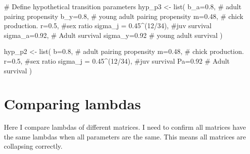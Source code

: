 \documentclass[
  letterpaper,
  DIV=11,
  numbers=noendperiod]{scrartcl}
\newenvironment{Shaded}{\begin{snugshade}}{\end{snugshade}}
\newcommand{\AttributeTok}[1]{\textcolor[rgb]{0.40,0.45,0.13}{#1}}
\newcommand{\CommentTok}[1]{\textcolor[rgb]{0.37,0.37,0.37}{#1}}
\newcommand{\DecValTok}[1]{\textcolor[rgb]{0.68,0.00,0.00}{#1}}
\newcommand{\FloatTok}[1]{\textcolor[rgb]{0.68,0.00,0.00}{#1}}
\newcommand{\FunctionTok}[1]{\textcolor[rgb]{0.28,0.35,0.67}{#1}}
\newcommand{\NormalTok}[1]{\textcolor[rgb]{0.00,0.23,0.31}{#1}}
\newcommand{\OtherTok}[1]{\textcolor[rgb]{0.00,0.23,0.31}{#1}}
\newcommand{\SpecialCharTok}[1]{\textcolor[rgb]{0.37,0.37,0.37}{#1}}
\begin{document}
\begin{Shaded}
\begin{Highlighting}[]
\CommentTok{\# Define hypothetical transition parameters}
\NormalTok{hyp\_p3 }\OtherTok{\textless{}{-}} \FunctionTok{list}\NormalTok{(}
  \AttributeTok{b\_a=}\FloatTok{0.8}\NormalTok{,   }\CommentTok{\# adult pairing propensity}
  \AttributeTok{b\_y=}\FloatTok{0.8}\NormalTok{, }\CommentTok{\# young adult pairing propensity}
  \AttributeTok{m=}\FloatTok{0.48}\NormalTok{, }\CommentTok{\# chick production.    }
  \AttributeTok{r=}\FloatTok{0.5}\NormalTok{,   }\CommentTok{\#sex ratio   }
  \AttributeTok{sigma\_j =} \FloatTok{0.45}\SpecialCharTok{\^{}}\NormalTok{(}\DecValTok{12}\SpecialCharTok{/}\DecValTok{34}\NormalTok{), }\CommentTok{\#juv survival}
  \AttributeTok{sigma\_a=}\FloatTok{0.92}\NormalTok{,  }\CommentTok{\# Adult survival}
  \AttributeTok{sigma\_y=}\FloatTok{0.92} \CommentTok{\# young adult survival}
\NormalTok{)}

\NormalTok{hyp\_p2 }\OtherTok{\textless{}{-}} \FunctionTok{list}\NormalTok{(}
  \AttributeTok{b=}\FloatTok{0.8}\NormalTok{,   }\CommentTok{\# adult pairing propensity}
  \AttributeTok{m=}\FloatTok{0.48}\NormalTok{, }\CommentTok{\# chick production.    }
  \AttributeTok{r=}\FloatTok{0.5}\NormalTok{,   }\CommentTok{\#sex ratio   }
  \AttributeTok{sigma\_j =} \FloatTok{0.45}\SpecialCharTok{\^{}}\NormalTok{(}\DecValTok{12}\SpecialCharTok{/}\DecValTok{34}\NormalTok{), }\CommentTok{\#juv survival}
  \AttributeTok{Pa=}\FloatTok{0.92}  \CommentTok{\# Adult survival}
\NormalTok{)}
\end{Highlighting}
\end{Shaded}

\section{Comparing lambdas}\label{comparing-lambdas}

Here I compare lambdas of different matrices. I need to confirm all
matrices have the same lambdas when all parameters are the same. This
means all matrices are collapsing correctly.

\begin{Shaded}
\end{Shaded}
\end{document}
